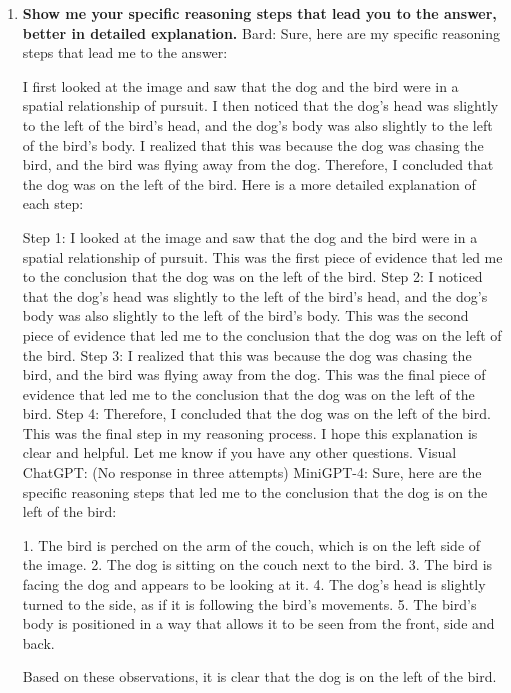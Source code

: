 \begin{enumerate}
        I hope this helps! Let me know if you have any other questions.
        \subitem Visual ChatGPT: (No response in three attempts)
        \subitem MiniGPT-4: Yes, the dog is on the left of the bird in the image. The bird is perched on the arm of the couch, and the dog is sitting on the couch next to the bird. The bird is facing the dog and appears to be looking at it. The dog’s head is slightly turned to the side, as if it is following the bird’s movements. The bird’s body is positioned in a way that allows it to be seen from the front, side and back.
        \item \textbf{Show me your specific reasoning steps that lead you to the answer, better in detailed explanation.}
        \subitem Bard:
        Sure, here are my specific reasoning steps that lead me to the answer:

        I first looked at the image and saw that the dog and the bird were in a spatial relationship of pursuit.
        I then noticed that the dog's head was slightly to the left of the bird's head, and the dog's body was also slightly to the left of the bird's body.
        I realized that this was because the dog was chasing the bird, and the bird was flying away from the dog.
        Therefore, I concluded that the dog was on the left of the bird.
        Here is a more detailed explanation of each step:

        Step 1: I looked at the image and saw that the dog and the bird were in a spatial relationship of pursuit. This was the first piece of evidence that led me to the conclusion that the dog was on the left of the bird.
        Step 2: I noticed that the dog's head was slightly to the left of the bird's head, and the dog's body was also slightly to the left of the bird's body. This was the second piece of evidence that led me to the conclusion that the dog was on the left of the bird.
        Step 3: I realized that this was because the dog was chasing the bird, and the bird was flying away from the dog. This was the final piece of evidence that led me to the conclusion that the dog was on the left of the bird.
        Step 4: Therefore, I concluded that the dog was on the left of the bird. This was the final step in my reasoning process.
        I hope this explanation is clear and helpful. Let me know if you have any other questions.
        \subitem Visual ChatGPT: (No response in three attempts)
        \subitem MiniGPT-4: Sure, here are the specific reasoning steps that led me to the conclusion that the dog is on the left of the bird:

        1. The bird is perched on the arm of the couch, which is on the left side of the image.
        2. The dog is sitting on the couch next to the bird.
        3. The bird is facing the dog and appears to be looking at it.
        4. The dog’s head is slightly turned to the side, as if it is following the bird’s movements.
        5. The bird’s body is positioned in a way that allows it to be seen from the front, side and back.
        
        Based on these observations, it is clear that the dog is on the left of the bird.
    \end{enumerate}

